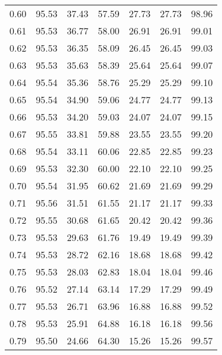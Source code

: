 \begin{tabular}{|c|c|c|c|c|c|c|}
      0.60 &     95.53 &     37.43 &      57.59 &   27.73 &      27.73 &         98.96 \\
      0.61 &     95.53 &     36.77 &      58.00 &   26.91 &      26.91 &         99.01 \\
      0.62 &     95.53 &     36.35 &      58.09 &   26.45 &      26.45 &         99.03 \\
      0.63 &     95.53 &     35.63 &      58.39 &   25.64 &      25.64 &         99.07 \\
      0.64 &     95.54 &     35.36 &      58.76 &   25.29 &      25.29 &         99.10 \\
      0.65 &     95.54 &     34.90 &      59.06 &   24.77 &      24.77 &         99.13 \\
      0.66 &     95.53 &     34.20 &      59.03 &   24.07 &      24.07 &         99.15 \\
      0.67 &     95.55 &     33.81 &      59.88 &   23.55 &      23.55 &         99.20 \\
      0.68 &     95.54 &     33.11 &      60.06 &   22.85 &      22.85 &         99.23 \\
      0.69 &     95.53 &     32.30 &      60.00 &   22.10 &      22.10 &         99.25 \\
      0.70 &     95.54 &     31.95 &      60.62 &   21.69 &      21.69 &         99.29 \\
      0.71 &     95.56 &     31.51 &      61.55 &   21.17 &      21.17 &         99.33 \\
      0.72 &     95.55 &     30.68 &      61.65 &   20.42 &      20.42 &         99.36 \\
      0.73 &     95.53 &     29.63 &      61.76 &   19.49 &      19.49 &         99.39 \\
      0.74 &     95.53 &     28.72 &      62.16 &   18.68 &      18.68 &         99.42 \\
      0.75 &     95.53 &     28.03 &      62.83 &   18.04 &      18.04 &         99.46 \\
      0.76 &     95.52 &     27.14 &      63.14 &   17.29 &      17.29 &         99.49 \\
      0.77 &     95.53 &     26.71 &      63.96 &   16.88 &      16.88 &         99.52 \\
      0.78 &     95.53 &     25.91 &      64.88 &   16.18 &      16.18 &         99.56 \\
      0.79 &     95.50 &     24.66 &      64.30 &   15.26 &      15.26 &         99.57 \\

\end{tabular}
